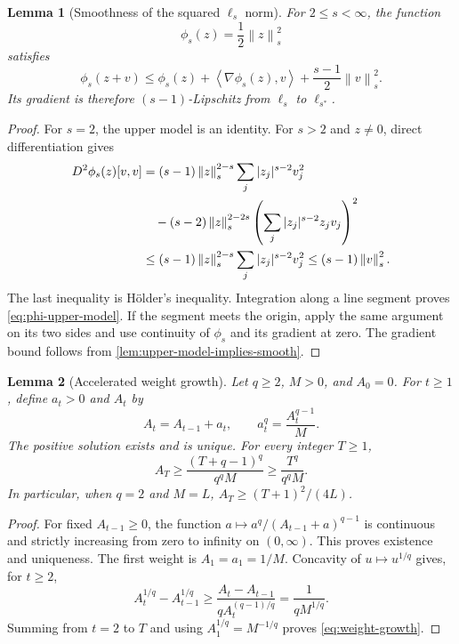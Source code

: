 \documentclass[11pt]{article}
\newcommand{\ip}[2]{\left\langle #1,#2\right\rangle}
\newcommand{\norm}[2]{\left\lVert #1\right\rVert_{#2}}
\newtheorem{lemma}[lemma]{Lemma}
\theoremstyle{definition}
\theoremstyle{remark}
\begin{document}
\begin{lemma}[Smoothness of the squared $\ell_s$ norm]
\label{lem:squared-ls-smooth}
For $2\le s<\infty$, the function
\begin{equation}
\label{eq:phi-s}
 \phi_s(z)=\frac12\norm{z}{s}^2
\end{equation}
satisfies
\begin{equation}
\label{eq:phi-upper-model}
 \phi_s(z+v)\le\phi_s(z)+\ip{\nabla\phi_s(z)}{v}
                    +\frac{s-1}{2}\norm{v}{s}^2.
\end{equation}
Its gradient is therefore $(s-1)$-Lipschitz from $\ell_s$ to $\ell_{s^*}$.
\end{lemma}

\begin{proof}
For $s=2$, the upper model is an identity.  For $s>2$ and $z\ne0$,
direct differentiation gives
\begin{align}
 D^2\phi_s(z)[v,v]
 &=(s-1)\norm{z}{s}^{2-s}
       \sum_j|z_j|^{s-2}v_j^2
 \notag\\
 &\quad-(s-2)\norm{z}{s}^{2-2s}
       \left(\sum_j|z_j|^{s-2}z_jv_j\right)^2
 \notag\\
 &\le(s-1)\norm{z}{s}^{2-s}
       \sum_j|z_j|^{s-2}v_j^2
 \le(s-1)\norm{v}{s}^2.
 \label{eq:phi-hessian}
\end{align}
The last inequality is H\"older's inequality.  Integration along a line
segment proves \cref{eq:phi-upper-model}.  If the segment meets the
origin, apply the same argument on its two sides and use continuity of
$\phi_s$ and its gradient at zero.  The gradient bound follows from
\cref{lem:upper-model-implies-smooth}.
\end{proof}

\begin{lemma}[Accelerated weight growth]
\label{lem:weight-growth}
Let $q\ge2$, $M>0$, and $A_0=0$.  For $t\ge1$, define $a_t>0$ and $A_t$ by
\begin{equation}
\label{eq:weight-equation-appendix}
 A_t=A_{t-1}+a_t,
 \qquad a_t^q=\frac{A_t^{q-1}}{M}.
\end{equation}
The positive solution exists and is unique.  For every integer $T\ge1$,
\begin{equation}
\label{eq:weight-growth}
 A_T\ge\frac{(T+q-1)^q}{q^qM}
       \ge\frac{T^q}{q^qM}.
\end{equation}
In particular, when $q=2$ and $M=L$,
$A_T\ge(T+1)^2/(4L)$.
\end{lemma}

\begin{proof}
For fixed $A_{t-1}\ge0$, the function
$a\mapsto a^q/(A_{t-1}+a)^{q-1}$ is continuous and strictly increasing
from zero to infinity on $(0,\infty)$.  This proves existence and
uniqueness.  The first weight is $A_1=a_1=1/M$.
Concavity of $u\mapsto u^{1/q}$ gives, for $t\ge2$,
\[
 A_t^{1/q}-A_{t-1}^{1/q}
 \ge\frac{A_t-A_{t-1}}{qA_t^{(q-1)/q}}
 =\frac{1}{qM^{1/q}}.
\]
Summing from $t=2$ to $T$ and using $A_1^{1/q}=M^{-1/q}$ proves
\cref{eq:weight-growth}.
\end{proof}
\end{document}
